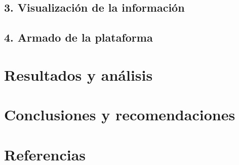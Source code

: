\documentclass[
]{article}
\begin{document}
\hypertarget{visualizaciuxf3n-de-la-informaciuxf3n}{%
\subsection{3. Visualización de la
información}\label{visualizaciuxf3n-de-la-informaciuxf3n}}

\hypertarget{armado-de-la-plataforma}{%
\subsection{4. Armado de la plataforma}\label{armado-de-la-plataforma}}

\hypertarget{resultados-y-anuxe1lisis}{%
\section{Resultados y análisis}\label{resultados-y-anuxe1lisis}}

\hypertarget{conclusiones-y-recomendaciones}{%
\section{Conclusiones y
recomendaciones}\label{conclusiones-y-recomendaciones}}

\hypertarget{referencias}{%
\section{Referencias}\label{referencias}}
\end{document}
